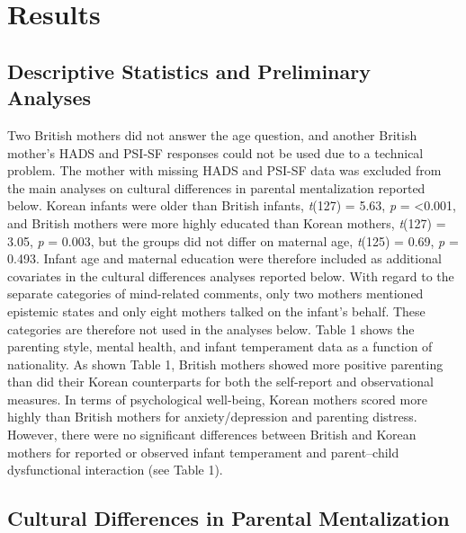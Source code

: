 \documentclass[
]{article}
\begin{document}
\hypertarget{results}{%
\section*{Results}\label{results}}

\hypertarget{descriptive-statistics-and-preliminary-analyses}{%
\subsection*{Descriptive Statistics and Preliminary Analyses}\label{descriptive-statistics-and-preliminary-analyses}}

Two British mothers did not answer the age question, and another British mother's HADS and PSI-SF responses could not be used due to a technical problem. The mother with missing HADS and PSI-SF data was excluded from the main analyses on cultural differences in parental mentalization reported below.
Korean infants were older than British infants, \emph{t}(127) = 5.63, \emph{p} = \textless0.001,
and British mothers were more highly educated than Korean mothers, \emph{t}(127) = 3.05, \emph{p} = 0.003,
but the groups did not differ on maternal age, \emph{t}(125) = 0.69, \emph{p} = 0.493.
Infant age and maternal education were therefore included as additional covariates in the cultural differences analyses reported below. With regard to the separate categories of mind-related comments, only two mothers mentioned epistemic states and only eight mothers talked on the infant's behalf. These categories are therefore not used in the analyses below. Table 1 shows the parenting style, mental health, and infant temperament data as a function of nationality. As shown Table 1, British mothers showed more positive parenting than did their Korean counterparts for both the self-report and observational measures. In terms of psychological well-being, Korean mothers scored more highly than British mothers for anxiety/depression and parenting distress. However, there were no significant differences between British and Korean mothers for reported or observed infant temperament and parent--child dysfunctional interaction (see Table 1).

\hypertarget{cultural-differences-in-parental-mentalization}{%
\subsection*{Cultural Differences in Parental Mentalization}\label{cultural-differences-in-parental-mentalization}}
\end{document}
